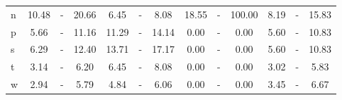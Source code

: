 \begin{table*}[h!]
\begin{center}
\begin{tabular}{  l | c   c   c | c   c   c | c   c   c | c   c   c  }
n & 10.48  & -  & 20.66  & 6.45  & -  & 8.08  & 18.55  & -  & 100.00  & 8.19  & -  & 15.83 \\
p & 5.66  & -  & 11.16  & 11.29  & -  & 14.14  & 0.00  & -  & 0.00  & 5.60  & -  & 10.83 \\\hline
s & 6.29  & -  & 12.40  & 13.71  & -  & 17.17  & 0.00  & -  & 0.00  & 5.60  & -  & 10.83 \\
t & 3.14  & -  & 6.20  & 6.45  & -  & 8.08  & 0.00  & -  & 0.00  & 3.02  & -  & 5.83 \\
w & 2.94  & -  & 5.79  & 4.84  & -  & 6.06  & 0.00  & -  & 0.00  & 3.45  & -  & 6.67 \\
\end{tabular}\end{center}
\end{table*}